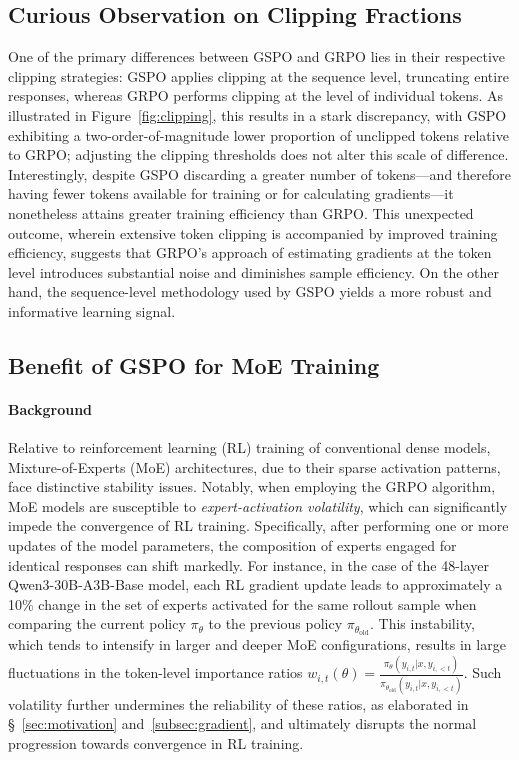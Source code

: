 \subsection{Curious Observation on Clipping Fractions}

One of the primary differences between GSPO and GRPO lies in their respective clipping strategies: GSPO applies clipping at the sequence level, truncating entire responses, whereas GRPO performs clipping at the level of individual tokens. As illustrated in Figure~\ref{fig:clipping}, this results in a stark discrepancy, with GSPO exhibiting a two-order-of-magnitude lower proportion of unclipped tokens relative to GRPO; adjusting the clipping thresholds does not alter this scale of difference. Interestingly, despite GSPO discarding a greater number of tokens—and therefore having fewer tokens available for training or for calculating gradients—it nonetheless attains greater training efficiency than GRPO. This unexpected outcome, wherein extensive token clipping is accompanied by improved training efficiency, suggests that GRPO’s approach of estimating gradients at the token level introduces substantial noise and diminishes sample efficiency. On the other hand, the sequence-level methodology used by GSPO yields a more robust and informative learning signal.

\subsection{Benefit of GSPO for MoE Training}
\label{subsec:routing_replay}

\paragraph{Background}
Relative to reinforcement learning (RL) training of conventional dense models, Mixture-of-Experts (MoE) architectures, due to their sparse activation patterns, face distinctive stability issues. Notably, when employing the GRPO algorithm, MoE models are susceptible to \textit{expert-activation volatility}, which can significantly impede the convergence of RL training. Specifically, after performing one or more updates of the model parameters, the composition of experts engaged for identical responses can shift markedly. For instance, in the case of the 48-layer Qwen3-30B-A3B-Base model, each RL gradient update leads to approximately a 10\% change in the set of experts activated for the same rollout sample when comparing the current policy $\pi_{\theta}$ to the previous policy $\pi_{\theta_\text{old}}$.
This instability, which tends to intensify in larger and deeper MoE configurations, results in large fluctuations in the token-level importance ratios $w_{i,t}(\theta) = \frac{ \pi_{\theta} (y_{i,t} | x, y_{i,<t}) }{ \pi_{\theta_\text{old}} (y_{i,t} | x,y_{i,<t})}$. Such volatility further undermines the reliability of these ratios, as elaborated in \S~\ref{sec:motivation} and~\ref{subsec:gradient}, and ultimately disrupts the normal progression towards convergence in RL training.

